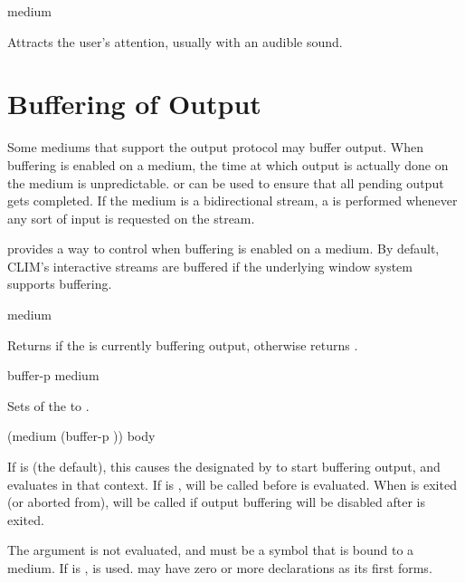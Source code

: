  {\optional medium}

Attracts the user's attention, usually with an audible sound.


\section {Buffering of Output}

Some mediums that support the output protocol may buffer output.  When buffering
is enabled on a medium, the time at which output is actually done on the medium
is unpredictable.   or  can be used to ensure
that all pending output gets completed.  If the medium is a bidirectional
stream, a  is performed whenever any sort of input is requested
on the stream.

 provides a way to control when buffering is enabled on
a medium.  By default, CLIM's interactive streams are buffered if the underlying
window system supports buffering.

 {medium}

Returns  if the   is currently buffering
output, otherwise returns .

 {buffer-p medium}

Sets  of the   to
.

 {(medium \optional (buffer-p ))
                                  \body body}

If  is  (the default), this causes the 
designated by  to start buffering output, and evaluates 
in that context.  If  is ,  will be
called before  is evaluated.  When  is exited (or aborted
from),  will be called if output buffering will be disabled
after  is exited.

The  argument is not evaluated, and must be a symbol that is bound
to a medium.  If  is ,  is used.
 may have zero or more declarations as its first forms.
